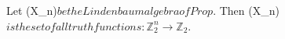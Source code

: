 Let (X_n)$ be the Lindenbaum algebra of Prop$. Then (X_n)$ is the set of all truth functions : \mathbb{Z}_2^n \to \mathbb{Z}_2$.
